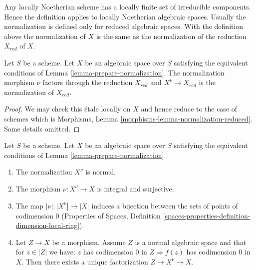 \noindent
Any locally Noetherian scheme has a locally finite set of irreducible
components. Hence the definition applies to locally Noetherian algebraic
spaces. Usually the normalization is defined only for reduced algebraic
spaces. With the definition above the normalization of $X$ is the same
as the normalization of the reduction $X_{red}$ of $X$.

\begin{lemma}
\label{lemma-normalization-reduced}
Let $S$ be a scheme. Let $X$ be an algebraic space over $S$ satisfying the
equivalent conditions of Lemma \ref{lemma-prepare-normalization}.
The normalization morphism $\nu$ factors through the reduction $X_{red}$
and $X^\nu \to X_{red}$ is the normalization of $X_{red}$.
\end{lemma}

\begin{proof}
We may check this \'etale locally on $X$ and hence reduce to the case
of schemes which is
Morphisms, Lemma \ref{morphisms-lemma-normalization-reduced}.
Some details omitted.
\end{proof}

\begin{lemma}
\label{lemma-normalization-normal}
Let $S$ be a scheme. Let $X$ be an algebraic space over $S$ satisfying the
equivalent conditions of Lemma \ref{lemma-prepare-normalization}.
\begin{enumerate}
\item The normalization $X^\nu$ is normal.
\item The morphism $\nu : X^\nu \to X$ is integral and surjective.
\item The map $|\nu| : |X^\nu| \to |X|$ induces a bijection between
the sets of points of codimension $0$ (Properties of Spaces,
Definition \ref{spaces-properties-definition-dimension-local-ring}).
\item Let $Z \to X$ be a morphism. Assume $Z$ is a normal algebraic space
and that for $z \in |Z|$ we have: $z$ has codimension $0$ in
$Z \Rightarrow f(z)$ has codimension $0$ in $X$. Then
there exists a unique factorization $Z \to X^\nu \to X$.
\end{enumerate}
\end{lemma}


